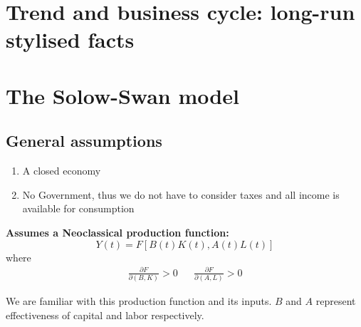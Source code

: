 \section{Trend and business cycle: long-run stylised facts}

\section{The Solow-Swan model}\label{solow-swan-model}
\subsection*{General assumptions}
\begin{enumerate}
    \item A closed economy
    \item No Government, thus we do not have to consider taxes and all income is available for consumption
\end{enumerate}

\textbf{Assumes a Neoclassical production function:}
\begin{equation}\label{production_function}
Y(t)=F\left[B(t)K(t), A(t)L(t)\right]
\end{equation}
 where
 \begin{align*}
 \frac{\partial F}{\partial (B,K)}>0
 &&
 \frac{\partial F}{\partial (A,L)}>0
 \end{align*}

We are familiar with this production function and its inputs. $B$ and $A$ represent effectiveness of capital and labor respectively. 


